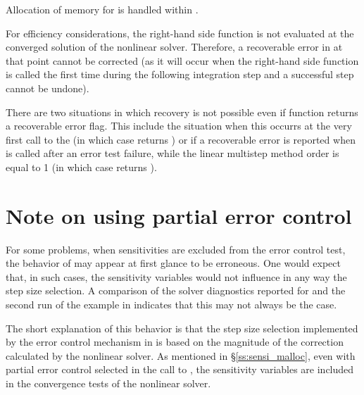 {
  Allocation of memory for  is handled within {\idas}.

  {\warn}For efficiency considerations, the right-hand side function is not
  evaluated at the converged solution of the nonlinear solver. Therefore, a
  recoverable error in  at that point cannot be corrected (as it will 
  occur when the right-hand side function is called the first time during the 
  following integration step and a successful step cannot be undone).

  There are two situations in which recovery is not possible even if 
  function returns a recoverable error flag. This include the situation when this
  occurrs at the very first call to the  (in which case {\idas} returns
  ) or if a recoverable error is reported when 
  is called after an error test failure, while the linear multistep method order is
  equal to 1 (in which case {\idas} returns ).
}
\section{Note on using partial error control}\label{ss:partial}
For some problems, when sensitivities are excluded from the error control test, 
the behavior of {\idas} may appear at first glance to be erroneous. One would
expect that, in such cases, the sensitivity variables would not influence in
any way the step size selection. A comparison of the solver diagnostics 
reported for  and the second run of the  example 
in \cite{idas2.3.0_ex} indicates that this may not always be the case.

The short explanation of this behavior is that the step size selection
implemented by the error control mechanism in {\idas} is based on the 
magnitude of the correction calculated by the nonlinear solver. As mentioned
in \S\ref{ss:sensi_malloc}, even with partial error control selected
in the call to , the sensitivity variables are included
in the convergence tests of the nonlinear solver.

